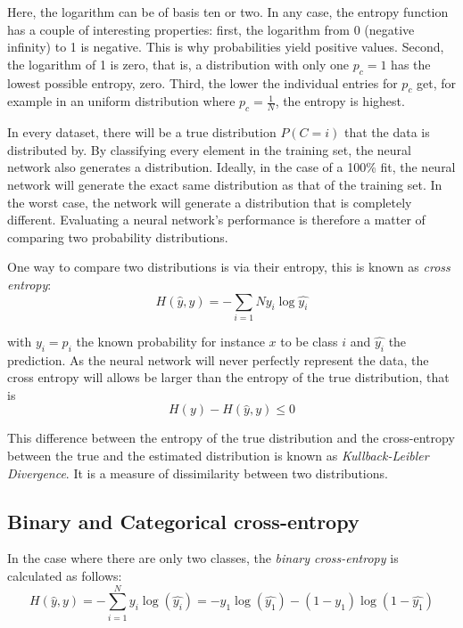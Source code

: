 Here, the logarithm can be of basis ten or two. In any case, the entropy function has a couple of interesting properties: first, the logarithm from 0 (negative infinity) to 1 is negative. This is why probabilities yield positive values. Second, the logarithm of 1 is zero, that is, a distribution with only one $p_c=1$ has the lowest possible entropy, zero. Third, the lower the individual entries for $p_c$ get, for example in an uniform distribution where $p_c=\frac{1}{N}$, the entropy is highest.

In every dataset, there will be a true distribution $P(C=i)$ that the data is distributed by. By classifying every element in the training set, the neural network also generates a distribution. Ideally, in the case of a 100\% fit, the neural network will generate the exact same distribution as that of the training set. In the worst case, the network will generate a distribution that is completely different. Evaluating a neural network's performance is therefore a matter of comparing two probability distributions.

One way to compare two distributions is via their entropy, this is known as \textsl{cross entropy}:
\begin{equation}
H(\hat{y},y)=-\sum_{i=1}{N}y_i\log \hat{y_i}
\end{equation}

with $y_i=p_i$ the known probability for instance $x$ to be class $i$ and $\hat{y_i}$ the prediction. As the neural network will never perfectly represent the data, the cross entropy will allows be larger than the entropy of the true distribution, that is
\begin{equation}
H(y)-H(\hat{y},y) \leq 0
\end{equation}

This difference between the entropy of the true distribution and the cross-entropy between the true and the estimated distribution is known as \textsl{Kullback-Leibler Divergence}. It is a measure of dissimilarity between two distributions.

\subsection{Binary and Categorical cross-entropy}
In the case where there are only two classes, the \textsl{binary cross-entropy} is calculated as follows:
\begin{equation}
H(\hat{y},y)=-\sum_{i=1}^Ny_i\log(\hat{y_i})=-y_1\log(\hat{y_1})-(1-y_1)\log(1-\hat{y_1})
\end{equation}

